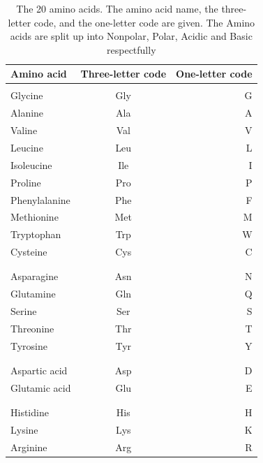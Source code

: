 \documentclass[]{final_report}
\begin{document}
\begin{table}[h!]
    \begin{center}\label{tab:Amino acids}
        \begin{tabular}{l|c|r}
        Amino acid & Three-letter code & One-letter code\\
        \hline
        \\
        Glycine & Gly & G\\
        Alanine & Ala & A\\
        Valine & Val & V\\
        Leucine & Leu & L\\
        Isoleucine & Ile & I\\
        Proline & Pro & P\\
        Phenylalanine & Phe & F\\
        Methionine & Met & M\\
        Tryptophan & Trp & W\\
        Cysteine & Cys & C\\
        \\
        \hline
        \\
        Asparagine & Asn & N\\
        Glutamine & Gln & Q\\
        Serine & Ser & S\\
        Threonine & Thr & T\\
        Tyrosine & Tyr & Y\\
        \\
        \hline
        \\
        Aspartic acid & Asp & D\\
        Glutamic acid & Glu & E\\
        \\
        \hline
        \\
        Histidine & His & H\\
        Lysine & Lys & K\\
        Arginine & Arg & R\\
        \end{tabular}
        \caption{\label{Amino acids}The 20 amino acids. The amino acid name, the three-letter code, and the one-letter code are given. The Amino acids are split up into Nonpolar, Polar, Acidic and Basic respectfully}
    \end{center}
\end{table}
\end{document}
